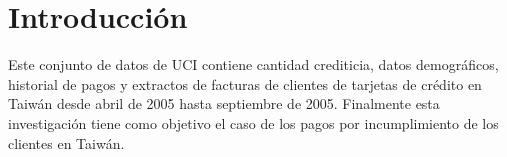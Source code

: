 \documentclass[12pt]{report}
\renewcommand{\_}{\kern-1.5pt\textunderscore\kern-1.5pt}
\begin{document}
\vspace{\baselineskip}
\vspace{\baselineskip}
\vspace{\baselineskip}
\vspace{\baselineskip}
\vspace{\baselineskip}
\vspace{\baselineskip}
\vspace{\baselineskip}
\vspace{\baselineskip}
\vspace{\baselineskip}
\vspace{\baselineskip}
\vspace{\baselineskip}
\vspace{\baselineskip}
\vspace{\baselineskip}
\vspace{\baselineskip}
\vspace{\baselineskip}

\vspace{\baselineskip}
\section{ Introducción}

\vspace{\baselineskip}
Este conjunto de datos de UCI contiene cantidad crediticia, datos demográficos, historial de pagos y extractos de facturas de clientes de tarjetas de crédito en Taiwán desde abril de 2005 hasta septiembre de 2005. Finalmente esta investigación tiene como objetivo el caso de los pagos por incumplimiento de los clientes en Taiwán.

\vspace{\baselineskip}

\vspace{\baselineskip}

\vspace{\baselineskip}

\vspace{\baselineskip}

\vspace{\baselineskip}

\vspace{\baselineskip}

\vspace{\baselineskip}

\vspace{\baselineskip}

\vspace{\baselineskip}
\end{document}
